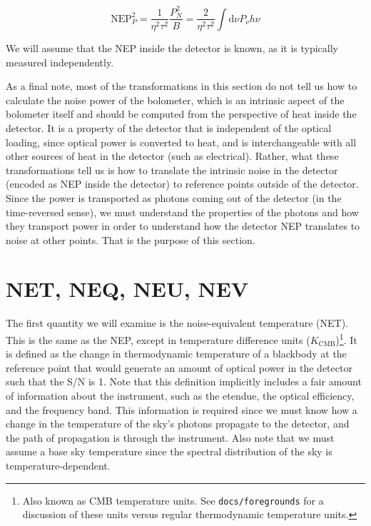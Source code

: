 \documentclass[twoside,10pt]{article}
\newcommand{\dd}[0]{\mathrm{d}}
\newcommand{\NEP}[0]{\mathrm{NEP}}
\newcommand{\KCMB}[0]{K_\mathrm{CMB}}
\begin{document}
\begin{equation}
    \NEP_P^2 = \frac{1}{\eta^2\tau^2} \frac{P_N^2}{B} = \frac{2}{\eta^2\tau^2} \int\dd\nu P_\nu h\nu
\end{equation}

We will assume that the NEP inside the detector is known, as it is typically
measured independently.

As a final note, most of the transformations in this section do not tell us
how to calculate the noise power of the bolometer, which is an intrinsic
aspect of the bolometer itself and should be computed from the perspective of
heat inside the detector. It is a property of the detector that is independent
of the optical loading, since optical power is converted to heat, and is
interchangeable with all other sources of heat in the detector (such as
electrical). Rather, what these transformations tell us is how to translate
the intrinsic noise in the detector (encoded as NEP inside the detector) to
reference points outside of the detector. Since the power is transported as
photons coming out of the detector (in the time-reversed sense), we must
understand the properties of the photons and how they transport power in order
to understand how the detector NEP translates to noise at other points. That
is the purpose of this section.

\section{NET, NEQ, NEU, NEV}
\label{sec:net_neq_neu_nev}

The first quantity we will examine is the noise-equivalent temperature (NET).
This is the same as the NEP, except in temperature difference units
($\unit{\KCMB}$)\footnote{Also known as CMB temperature units. See
\texttt{docs/foregrounds} for a discussion of these units versus regular
thermodynamic temperature units.}. It is defined as the change in
thermodynamic temperature of a blackbody at the reference point that would
generate an amount of optical power in the detector such that the S/N is 1.
Note that this definition implicitly includes a fair amount of information
about the instrument, such as the etendue, the optical efficiency, and the
frequency band. This information is required since we must know how a change
in the temperature of the sky's photons propagate to the detector, and the
path of propagation is through the instrument. Also note that we must assume a
base sky temperature since the spectral distribution of the sky is
temperature-dependent.
\end{document}
